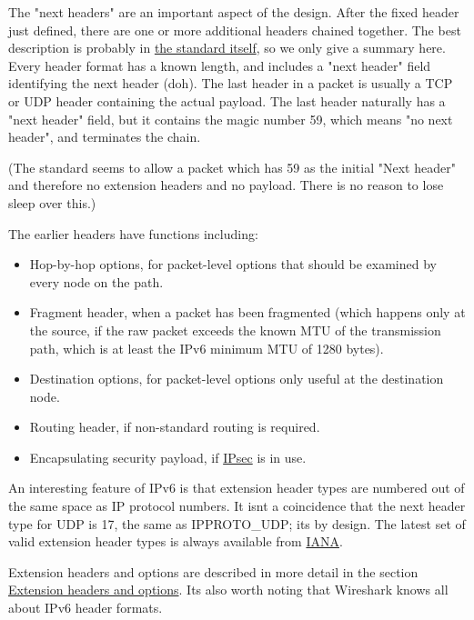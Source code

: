 \documentclass[
]{article}
\begin{document}
The "next headers" are an important aspect of the design. After the
fixed header just defined, there are one or more additional headers
chained together. The best description is probably in
\href{https://www.rfc-editor.org/info/rfc8200}{the standard itself}, so
we only give a summary here. Every header format has a known length, and
includes a "next header" field identifying the next header
(d\textquotesingle oh). The last header in a packet is usually a TCP or
UDP header containing the actual payload. The last header naturally has
a "next header" field, but it contains the magic number 59, which means
"no next header", and terminates the chain.

(The standard seems to allow a packet which has 59 as the initial "Next
header" and therefore no extension headers and no payload. There is no
reason to lose sleep over this.)

The earlier headers have functions including:

\begin{itemize}
\item
  Hop-by-hop options, for packet-level options that should be examined
  by every node on the path.
\item
  Fragment header, when a packet has been fragmented (which happens only
  at the source, if the raw packet exceeds the known MTU of the
  transmission path, which is at least the IPv6 minimum MTU of 1280
  bytes).
\item
  Destination options, for packet-level options only useful at the
  destination node.
\item
  Routing header, if non-standard routing is required.
\item
  Encapsulating security payload, if
  \href{https://www.rfc-editor.org/info/rfc4303}{IPsec} is in use.
\end{itemize}

An interesting feature of IPv6 is that extension header types are
numbered out of the same space as IP protocol numbers. It
isn\textquotesingle t a coincidence that the next header type for UDP is
17, the same as IPPROTO\_UDP; it\textquotesingle s by design. The latest
set of valid extension header types is always available from
\href{https://www.iana.org/assignments/ipv6-parameters/ipv6-parameters.xhtml}{IANA}.

Extension headers and options are described in more detail in the
section \hyperref[extension-headers-and-options]{Extension headers and
options}. It\textquotesingle s also worth noting that Wireshark knows
all about IPv6 header formats.
\end{document}
